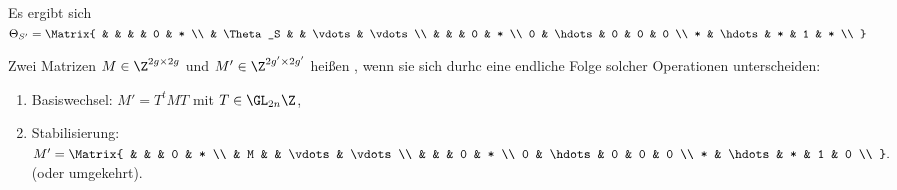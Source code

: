Es ergibt sich
\begin{math}
    \Theta_{S'} =
    \Matrix{
        &  &  & & 0 & * \\
        & \Theta_S & & \vdots & \vdots \\
        & & & 0 & * \\
        0 & \hdots & 0 & 0 & 0 \\
        * & \hdots & * & 1 & * \\
    }
\end{math}

\begin{df}
    Zwei Matrizen $M \in \Z^{2g \times 2g}$ und $M' \in \Z^{2g' \times 2g'}$ heißen , wenn sie sich durhc eine endliche Folge solcher Operationen unterscheiden:
    \begin{enumerate}[1)]
        \item
            Basiswechsel: $M' = T^t M T$ mit $T \in \GL_{2n} \Z$,
        \item
            Stabilisierung:
            \begin{math}
                M' =
                \Matrix{
                    &  &  &  0 & * \\
                    & M & & \vdots & \vdots \\
                    & & & 0 & * \\
                    0 & \hdots & 0 & 0 & 0 \\
                    * & \hdots & * & 1 & 0 \\
                }.
            \end{math}
            (oder umgekehrt).
    \end{enumerate}
\end{df}

